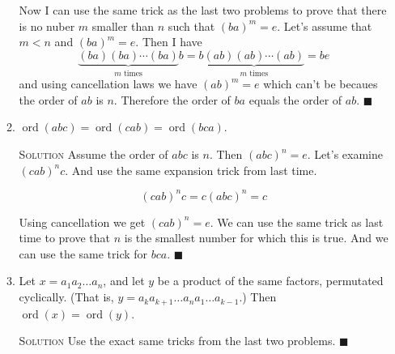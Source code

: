 \documentclass[twoside]{amsart}
\newcommand{\solution}{\textsc{Solution}\xspace}
\newcommand{\blank}{\vspace{5pt}}
\renewcommand{\qed}{\blacksquare}
\newcommand{\itm}{\blank\item}
\newcommand{\sol}{\blank\noindent\solution}
\newcommand{\ord}{\mathop{\mathrm{ord}}}
\begin{document}
\begin{enumerate}[A.]
\begin{enumerate}[1]
      Now I can use the same trick as the last two problems to prove
      that there is no nuber $m$ smaller than  $n$  such that $(ba)^m = e$.
      Let's assume that $m < n$ and $(ba)^m = e$. Then I have
      \[
         \underbrace{(ba)(ba) \cdots (ba)}_{m\text{ times}}b = 
         b\underbrace{(ab)(ab) \cdots (ab)}_{m\text{ times}} = be
      \]
      and using cancellation laws we have $(ab)^m = e$ which can't be
      becaues the order of $ab$ is $n$. Therefore the order
      of $ba$ equals the order of $ab$. $\qed$

      \itm $\ord(abc) = \ord(cab) = \ord(bca)$.

      \sol Assume the order of $abc$ is $n$. Then $(abc)^n = e$.
      Let's examine $(cab)^nc$. And use the same expansion trick
      from last time.

      \[
         (cab)^nc = c(abc)^n = c
      \]

      Using cancellation we get $(cab)^n = e$. We can use the same trick
      as last time to prove that $n$ is the smallest number for which
      this is true.  And we can use the same trick for $bca$. $\qed$

      \itm Let $x=a_1 a_2 \ldots a_n$, and let $y$ be a product of the same
      factors, permutated cyclically. (That is, $y = a_k a_{k+1} \ldots
      a_n a_1 \ldots a_{k-1}$.) Then $\ord(x) = \ord(y)$.

      \sol Use the exact same tricks from the last two problems. $\qed$


   \end{enumerate}


\end{enumerate}
\end{document}

